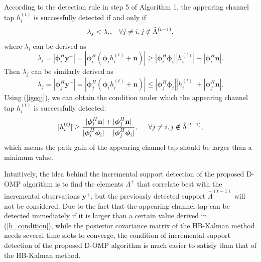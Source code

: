 \documentclass[conference]{IEEEtran}
\begin{document}
According to the detection rule in step 5 of Algorithm 1, the appearing channel tap $h_i^{(t)}$ is successfully detected if and only if
\begin{equation}
\label{igeqj}
\lambda_j<\lambda_i,\hspace{0.3cm} \forall j\neq i, j\notin\hat{\Lambda}^{(t-1)},
\end{equation}
where $\lambda_i$ can be derived as
\begin{equation}
\label{lambda_i}
\lambda_i=|\boldsymbol{\phi}_i^{H}\mathbf{y}^{+}|=|\boldsymbol{\phi}_i^{H}(\boldsymbol{\phi}_i h_i^{(t)}+\mathbf{n})|\geq|\boldsymbol{\phi}_i^{H}\boldsymbol{\phi}_i| |h_i^{(t)}|-|\boldsymbol{\phi}_i^{H}\mathbf{n}|.
\end{equation}
Then $\lambda_j$ can be similarly derived as
\begin{equation}
\label{lambda_j}
\lambda_j=|\boldsymbol{\phi}_j^{H}\mathbf{y}^{+}|=|\boldsymbol{\phi}_j^{H}(\boldsymbol{\phi}_i h_i^{(t)}+\mathbf{n})|\leq |\boldsymbol{\phi}_j^{H}\boldsymbol{\phi}_i| |h_i^{(t)}|+|\boldsymbol{\phi}_j^{H}\mathbf{n}|.
\end{equation}
Using (\ref{igeqj}), we can obtain the condition under which the appearing channel tap $h_i^{(t)}$ is successfully detected:
\begin{equation}
\label{h_condition}
|h_i^{(t)}|\geq\frac{|\boldsymbol{\phi}_i^{H}\mathbf{n}|+|\boldsymbol{\phi}_j^{H}\mathbf{n}|}{|\boldsymbol{\phi}_i^{H}\boldsymbol{\phi}_i|-|\boldsymbol{\phi}_j^{H}\boldsymbol{\phi}_i|}, \hspace{0.5cm} \forall j\neq i, j\notin\hat{\Lambda}^{(t-1)},
\end{equation}
which means the path gain of the appearing channel tap should be larger than a minimum value.

Intuitively, the idea behind the incremental support detection of the proposed D-OMP algorithm is to find the elements $\Lambda^{+}$ that correlate best with the incremental observations $\mathbf{y}^{+}$, but the previously detected support $\hat{\Lambda}^{(t-1)}$ will not be considered.
Due to the fact that the appearing channel tap can be detected immediately if it is larger than a certain value derived in (\ref{h_condition}), while the posterior covariance matrix of the HB-Kalman method \cite{HB-Kalman} needs several time slots to converge, the condition of incremental support detection of the proposed D-OMP algorithm is much easier to satisfy than that of the HB-Kalman method.
\end{document}
